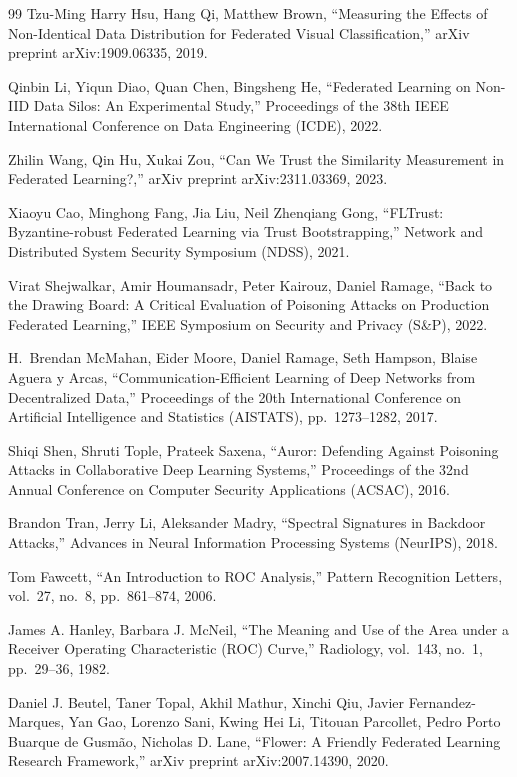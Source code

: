 \documentclass[a4paper,10pt]{article}
\begin{document}
{\begin{thebibliography}{99}
Tzu-Ming Harry Hsu, Hang Qi, Matthew Brown,
``Measuring the Effects of Non-Identical Data Distribution for Federated Visual Classification,''
arXiv preprint arXiv:1909.06335, 2019.

Qinbin Li, Yiqun Diao, Quan Chen, Bingsheng He,
``Federated Learning on Non-IID Data Silos: An Experimental Study,''
Proceedings of the 38th IEEE International Conference on Data Engineering (ICDE), 2022.

Zhilin Wang, Qin Hu, Xukai Zou,
``Can We Trust the Similarity Measurement in Federated Learning?,''
arXiv preprint arXiv:2311.03369, 2023.

Xiaoyu Cao, Minghong Fang, Jia Liu, Neil Zhenqiang Gong,
``FLTrust: Byzantine-robust Federated Learning via Trust Bootstrapping,''
Network and Distributed System Security Symposium (NDSS), 2021.

Virat Shejwalkar, Amir Houmansadr, Peter Kairouz, Daniel Ramage,
``Back to the Drawing Board: A Critical Evaluation of Poisoning Attacks on Production Federated Learning,''
IEEE Symposium on Security and Privacy (S\&P), 2022.

H.~Brendan McMahan, Eider Moore, Daniel Ramage, Seth Hampson, Blaise Aguera y Arcas,
``Communication-Efficient Learning of Deep Networks from Decentralized Data,''
Proceedings of the 20th International Conference on Artificial Intelligence and Statistics (AISTATS),
pp.~1273--1282, 2017.

Shiqi Shen, Shruti Tople, Prateek Saxena,
``Auror: Defending Against Poisoning Attacks in Collaborative Deep Learning Systems,''
Proceedings of the 32nd Annual Conference on Computer Security Applications (ACSAC), 2016.

Brandon Tran, Jerry Li, Aleksander Madry,
``Spectral Signatures in Backdoor Attacks,''
Advances in Neural Information Processing Systems (NeurIPS), 2018.

Tom Fawcett,
``An Introduction to ROC Analysis,''
Pattern Recognition Letters, vol.~27, no.~8, pp.~861--874, 2006.

James A. Hanley, Barbara J. McNeil,
``The Meaning and Use of the Area under a Receiver Operating Characteristic (ROC) Curve,''
Radiology, vol.~143, no.~1, pp.~29--36, 1982.

Daniel J. Beutel, Taner Topal, Akhil Mathur, Xinchi Qiu, Javier Fernandez-Marques, Yan Gao, Lorenzo Sani, Kwing Hei Li, Titouan Parcollet, Pedro Porto Buarque de Gusm\~{a}o, Nicholas D. Lane,
``Flower: A Friendly Federated Learning Research Framework,''
arXiv preprint arXiv:2007.14390, 2020.

\end{thebibliography}
}
\end{document}
